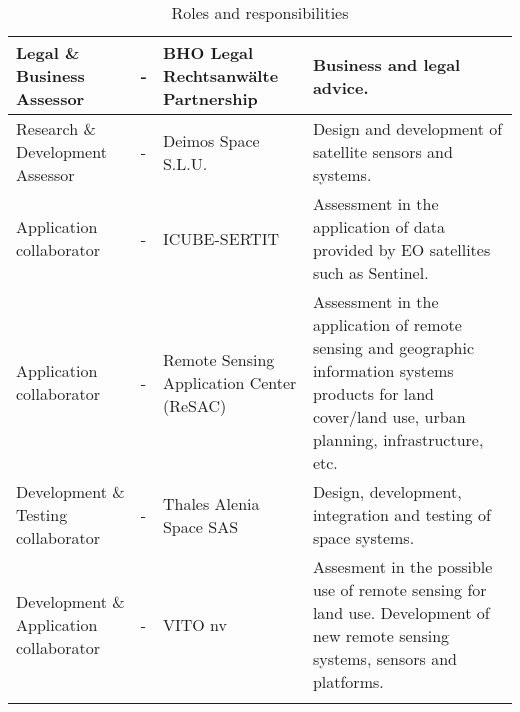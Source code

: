 \begin{center}
\begin{longtable}{>{\raggedright\arraybackslash}p{3cm}>{\raggedright\arraybackslash}p{3cm}>{\raggedright\arraybackslash}p{3cm}>{\raggedright\arraybackslash}p{5cm}}
		Legal \& Business Assessor & - & BHO Legal Rechtsanwälte Partnership & Business and legal advice. \\ \hline
		Research \& Development Assessor & - & Deimos Space S.L.U. & Design and development of satellite sensors and systems. \\ \hline
		Application collaborator & - & ICUBE-SERTIT & Assessment in the application of data provided by EO satellites such as Sentinel. \\ \hline
		Application collaborator & - & Remote Sensing Application Center (ReSAC) & Assessment in the application of remote sensing and geographic information systems products for land cover/land use, urban planning, infrastructure, etc. \\ \hline
		Development \& Testing collaborator & - & Thales Alenia Space SAS & Design, development, integration and testing of space systems. \\ \hline
		Development \& Application collaborator & - & VITO nv & Assesment in the possible use of remote sensing for land use. Development of new remote sensing systems, sensors and platforms. \\ \bottomrule[2pt]
		\caption{Roles and responsibilities}
		\label{table_roles}	
	\end{longtable}
\end{center}